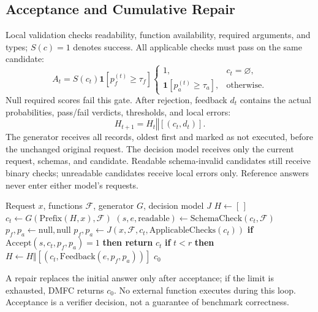 \subsection{Acceptance and Cumulative Repair}
Local validation checks readability, function availability, required arguments, and types; $S(c)=1$ denotes success. All applicable checks must pass on the same candidate:
\begin{equation}
A_t=S(c_t)\mathbf{1}[p_f^{(t)}\geq\tau_f]
\begin{cases}
1,&c_t=\varnothing,\\
\mathbf{1}[p_a^{(t)}\geq\tau_a],&\text{otherwise}.
\end{cases}
\label{eq:gate}
\end{equation}
Null required scores fail this gate. After rejection, feedback $d_t$ contains the actual probabilities, pass/fail verdicts, thresholds, and local errors:
\begin{equation}
H_{t+1}=H_t\mathbin{\Vert}[(c_t,d_t)].
\end{equation}
The generator receives all records, oldest first and marked as not executed, before the unchanged original request. The decision model receives only the current request, schemas, and candidate. Readable schema-invalid candidates still receive binary checks; unreadable candidates receive local errors only. Reference answers never enter either model's requests.

\begin{algorithm}[t]
\caption{\textbf{DMFC}: verification and cumulative repair}
\label{alg:jbfc}
\footnotesize
\begin{algorithmic}[1]
\Require Request $x$, functions $\mathcal{F}$, generator $G$, decision model $J$
\State $H\gets[\,]$
  \State $c_t\gets G(\mathrm{Prefix}(H,x),\mathcal{F})$
  \State $(s,e,\mathrm{readable})\gets\mathrm{SchemaCheck}(c_t,\mathcal{F})$
  \State $p_f,p_a\gets\mathrm{null},\mathrm{null}$
    \State $p_f,p_a\gets J(x,\mathcal{F},c_t,\mathrm{ApplicableChecks}(c_t))$
  \EndIf
  \State \textbf{if} $\mathrm{Accept}(s,c_t,p_f,p_a)=1$ \textbf{then return} $c_t$
  \State \textbf{if} $t<r$ \textbf{then} $H\gets H\Vert[(c_t,\mathrm{Feedback}(e,p_f,p_a))]$
\EndFor
\State \Return $c_0$
\end{algorithmic}
\end{algorithm}
A repair replaces the initial answer only after acceptance; if the limit is exhausted, DMFC returns $c_0$. No external function executes during this loop. Acceptance is a verifier decision, not a guarantee of benchmark correctness.
